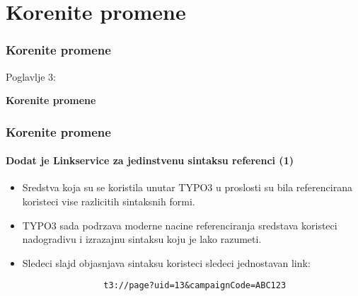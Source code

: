 %

\section{Korenite promene}
\begin{frame}[fragile]
	\frametitle{Korenite promene}

	\begin{center}\huge{Poglavlje 3:}\end{center}
	\begin{center}\huge{\color{typo3darkgrey}\textbf{Korenite promene}}\end{center}

\end{frame}

\begin{frame}[fragile]
	\frametitle{Korenite promene}
	\framesubtitle{Dodat je Linkservice za jedinstvenu sintaksu referenci (1)}

	\begin{itemize}

		\item Sredstva koja su se koristila unutar TYPO3 u proslosti su bila referencirana koristeci 
			vise razlicitih sintaksnih formi.

		\item TYPO3 sada podrzava moderne nacine referenciranja sredstava koristeci nadogradivu 
			i izrazajnu sintaksu koju je lako razumeti.

		\item Sledeci slajd objasnjava sintaksu koristeci sledeci jednostavan link:

			\begin{lstlisting}
				t3://page?uid=13&campaignCode=ABC123
			\end{lstlisting}

	\end{itemize}

\end{frame}

